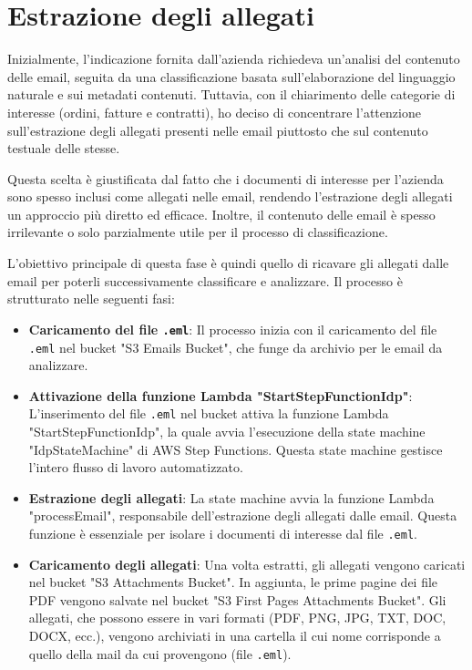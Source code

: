 \section{Estrazione degli allegati}
\label{sec:estrazione-allegati}
Inizialmente, l'indicazione fornita dall'azienda richiedeva un'analisi del contenuto delle email, seguita da una classificazione basata sull'elaborazione del linguaggio naturale e sui metadati contenuti. Tuttavia, con il chiarimento delle categorie di interesse (ordini, fatture e contratti), ho deciso di concentrare l'attenzione sull'estrazione degli allegati presenti nelle email piuttosto che sul contenuto testuale delle stesse.

Questa scelta è giustificata dal fatto che i documenti di interesse per l'azienda sono spesso inclusi come allegati nelle email, rendendo l'estrazione degli allegati un approccio più diretto ed efficace. Inoltre, il contenuto delle email è spesso irrilevante o solo parzialmente utile per il processo di classificazione.

L'obiettivo principale di questa fase è quindi quello di ricavare gli allegati dalle email per poterli successivamente classificare e analizzare. Il processo è strutturato nelle seguenti fasi:

\begin{itemize}
    \item \textbf{Caricamento del file \texttt{.eml}}: Il processo inizia con il caricamento del file \texttt{.eml} nel bucket "S3 Emails Bucket", che funge da archivio per le email da analizzare.
    
    \item \textbf{Attivazione della funzione Lambda "StartStepFunctionIdp"}: L'inserimento del file \texttt{.eml} nel bucket attiva la funzione Lambda "StartStepFunctionIdp", la quale avvia l'esecuzione della state machine "IdpStateMachine" di AWS Step Functions. Questa state machine gestisce l'intero flusso di lavoro automatizzato.

    \item \textbf{Estrazione degli allegati}: La state machine avvia la funzione Lambda "processEmail", responsabile dell'estrazione degli allegati dalle email. Questa funzione è essenziale per isolare i documenti di interesse dal file \texttt{.eml}.

    \item \textbf{Caricamento degli allegati}: Una volta estratti, gli allegati vengono caricati nel bucket "S3 Attachments Bucket". In aggiunta, le prime pagine dei file PDF vengono salvate nel bucket "S3 First Pages Attachments Bucket". Gli allegati, che possono essere in vari formati (PDF, PNG, JPG, TXT, DOC, DOCX, ecc.), vengono archiviati in una cartella il cui nome corrisponde a quello della mail da cui provengono (file \texttt{.eml}).
\end{itemize}

